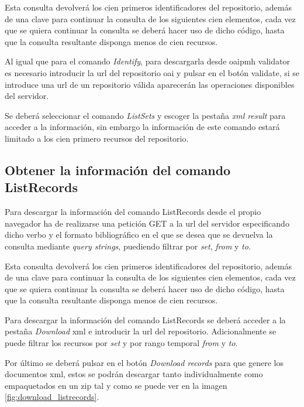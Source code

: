 Esta consulta devolverá los cien primeros identificadores del repositorio, además de una clave para continuar la consulta de los siguientes cien elementos, cada vez que se quiera continuar la consulta se deberá hacer uso de dicho código, hasta que la consulta resultante disponga menos de cien recursos. 

Al igual que para el comando \textit{Identify}, para descargarla desde \acrshort{oaipmh} validator es necesario introducir la \acrshort{url} del repositorio \acrshort{oai} y pulsar en el botón validate, si se introduce una \acrshort{url} de un repositorio válida aparecerán las operaciones disponibles del servidor.

Se deberá seleccionar el comando \textit{ListSets} y escoger la pestaña \textit{\acrshort{xml} result} para acceder a la información, sin embargo la información de este comando estará limitado a los cien primero recursos del repositorio.

\subsection{Obtener la información del comando ListRecords}

Para descargar la información del comando ListRecords desde el propio navegador ha de realizarse una petición GET a la \acrshort{url} del servidor especificando dicho verbo y el formato bibliográfico en el que se desea que se devuelva la consulta mediante \textit{query strings}, puediendo filtrar por \textit{set}, \textit{from} y \textit{to}.

Esta consulta devolverá los cien primeros identificadores del repositorio, además de una clave para continuar la consulta de los siguientes cien elementos, cada vez que se quiera continuar la consulta se deberá hacer uso de dicho código, hasta que la consulta resultante disponga menos de cien recursos.

Para descargar la información del comando ListRecords se deberá acceder a la pestaña \textit{Download} \acrshort{xml} e introducir la \acrshort{url} del repositorio. Adicionalmente se puede filtrar los recursos por \textit{set} y por rango temporal \textit{from} y \textit{to}.

Por último se deberá pulsar en el botón \textit{Download records} para que genere los documentos \acrshort{xml}, estos se podrán descargar tanto individualmente como empaquetados en un zip tal y como se puede ver en la imagen \ref{fig:download_listrecords}.

